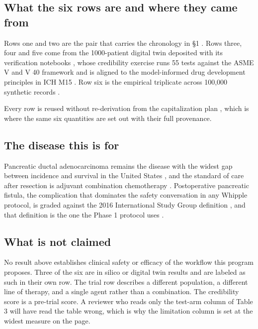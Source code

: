 \subsection{What the six rows are and where they came from}

Rows one and two are the pair that carries the chronology in §1
\cite{rasolute302,qspmetpancre}. Rows three, four and five come from the
1000-patient digital twin deposited with its verification notebooks
\cite{onpremwhippl}, whose credibility exercise runs 55 tests against the ASME V
and V 40 framework \cite{asmevv40} and is aligned to the model-informed drug
development principles in ICH M15 \cite{ichm15}. Row six is the empirical
triplicate across 100,000 synthetic records \cite{daraxident}.

Every row is reused without re-derivation from the capitalization plan
\cite{capitalplan2026}, which is where the same six quantities are set out with
their full provenance.

\subsection{The disease this is for}

Pancreatic ductal adenocarcinoma remains the disease with the widest gap between
incidence and survival in the United States \cite{siegel2025statistics}, and the
standard of care after resection is adjuvant combination chemotherapy
\cite{conroy2018folfirinox}. Postoperative pancreatic fistula, the complication
that dominates the safety conversation in any Whipple protocol, is graded against
the 2016 International Study Group definition \cite{bassi2017isgps}, and that
definition is the one the Phase 1 protocol uses \cite{onpremwhippl}.

\subsection{What is not claimed}

No result above establishes clinical safety or efficacy of the workflow this
program proposes. Three of the six are in silico or digital twin results and are
labeled as such in their own row. The trial row describes a different population,
a different line of therapy, and a single agent rather than a combination. The
credibility score is a pre-trial score. A reviewer who reads only the test-arm
column of Table 3 will have read the table wrong, which is why the limitation
column is set at the widest measure on the page.
